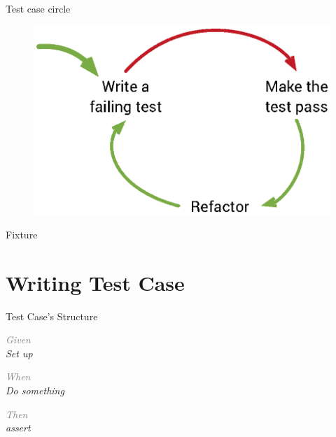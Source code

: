 \documentclass[14pt]{beamer}
\begin{document}
\begin{frame}[plain]{Test case circle}
    \begin{figure}
        \center
        \includegraphics[width=.9\textwidth]{failng-pass-refactor}
    \end{figure}
\end{frame}

\begin{frame}[plain]{Fixture}
    \begin{fullpageitemize}
        \item<1-> 
        \item<2-> \color{colorhgray}{Test Class}
        \item<3-> 
        \item<4-> \color{colorhgray}{Test cases}
        \item<5-> 
        \item<6-> \color{colorhgray}{Final test case}
        \item<7-> 
    \end{fullpageitemize}
\end{frame}

\section{Writing Test Case}
\begin{frame}[plain]{Test Case's Structure}
    \begin{fullpageitemize}
        \item<1-> \em{\textcolor{gray}{Given}} \\
            Set up \\

        \item<2-> \em{\textcolor{gray}{When}} \\
            Do something \\

        \item<3-> \em{\textcolor{gray}{Then}} \\
            assert
    \end{fullpageitemize}
\end{frame}
\end{document}
